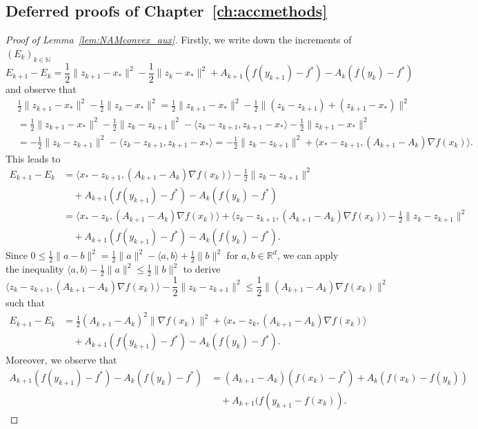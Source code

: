 \documentclass[12pt,openany]{book}
\theoremstyle{definition}
\theoremstyle{definition}
\newcommand{\N}{\mathbb{N}}
\newcommand{\R}{\mathbb{R}}
\begin{document}
\subsection{Deferred proofs of Chapter~\ref{ch:accmethods}}
\begin{proof}[Proof of Lemma~\ref{lem:NAMconvex_aux}]
Firstly, we write down the increments of $(E_k)_{k\in\N}$ 
\[E_{k+1}-E_k = \frac{1}{2}\|z_{k+1}-x_\ast\|^2 - \frac12 \|z_k-x_\ast\|^2 + A_{k+1}(f(y_{k+1})-f^\ast) - A_k (f(y_k)-f^\ast) \]
and observe that
\begin{align*}
&\frac12\|z_{k+1}-x_\ast\|^2 - \frac12\|z_k-x_\ast\|^2 = \frac12\|z_{k+1}-x_\ast\|^2 -\frac12\|(z_k-z_{k+1})+(z_{k+1}-x_\ast)\|^2 \\
&=\frac12\|z_{k+1}-x_\ast\|^2 - \frac12\|z_k-z_{k+1}\|^2 - \langle z_k-z_{k+1},z_{k+1}-x_\ast\rangle - \frac12\|z_{k+1}-x_\ast\|^2\\
&= -\frac12\|z_k-z_{k+1}\|^2 -\langle z_k-z_{k+1},z_{k+1}-x_\ast\rangle = -\frac12 \|z_k-z_{k+1}\|^2 + \langle x_\ast-z_{k+1},(A_{k+1}-A_k)\nabla f(x_k)\rangle.
\end{align*}
This leads to
\begin{align*}
E_{k+1}-E_k &= \langle x_\ast-z_{k+1},(A_{k+1}-A_k)\nabla f(x_k)\rangle -\frac12 \|z_k-z_{k+1}\|^2\\ &\quad + A_{k+1}(f(y_{k+1})-f^\ast) - A_k (f(y_k)-f^\ast)\\
&=  \langle x_\ast-z_{k},(A_{k+1}-A_k)\nabla f(x_k)\rangle+\langle z_{k}-z_{k+1},(A_{k+1}-A_k)\nabla f(x_k)\rangle  -\frac12 \|z_k-z_{k+1}\|^2\\
&\quad + A_{k+1}(f(y_{k+1})-f^\ast) - A_k (f(y_k)-f^\ast).
\end{align*}
Since $0\le \frac12\|a-b\|^2 = \frac12\|a\|^2 -\langle a,b\rangle +\frac12\|b\|^2$ for $a,b\in\R^d$, we can apply the inequality $\langle a,b\rangle -\frac12\|a\|^2\le \frac12\|b\|^2$ to derive
\[\langle z_{k}-z_{k+1},(A_{k+1}-A_k)\nabla f(x_k)\rangle -\frac12 \|z_k-z_{k+1}\|^2 \le \frac12\|(A_{k+1}-A_k)\nabla f(x_k)\|^2\]
such that
\begin{align*}
E_{k+1}-E_k &=  \frac12(A_{k+1}-A_k)^2\|\nabla f(x_k)\|^2+\langle x_\ast-z_{k},(A_{k+1}-A_k)\nabla f(x_k)\rangle\\
&\quad + A_{k+1}(f(y_{k+1})-f^\ast) - A_k (f(y_k)-f^\ast).
\end{align*}
Moreover, we observe that
\begin{align*}
A_{k+1}(f(y_{k+1})-f^\ast) - A_k (f(y_k)-f^\ast) &= (A_{k+1}-A_k)(f(x_k)-f^\ast) + A_k(f(x_k)-f(y_k))\\&\quad + A_{k+1} (f(y_{k+1}-f(x_k)).

\end{align*}
\end{proof}
\end{document}
